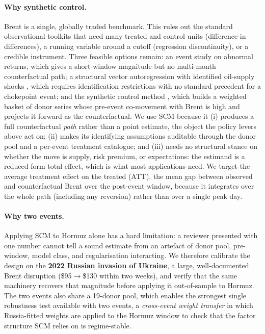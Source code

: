 \documentclass[11pt,a4paper]{article}
\begin{document}
\paragraph{Why synthetic control.} Brent is a single, globally traded benchmark.
This rules out the standard observational toolkits that need many treated and control
units (difference-in-differences), a running variable around a cutoff (regression
discontinuity), or a credible instrument. Three feasible options remain: an event
study on abnormal returns, which gives a short-window magnitude but no multi-month
counterfactual path; a structural vector autoregression with identified oil-supply
shocks \citep{kilian2009,baumeisterhamilton2019}, which requires identification
restrictions with no standard precedent for a chokepoint event; and the synthetic
control method \citep{abadie2010,abadie2021}, which builds a weighted basket of donor
series whose pre-event co-movement with Brent is high and projects it forward as the
counterfactual. We use SCM because it (i) produces a full counterfactual \emph{path}
rather than a point estimate, the object the policy levers above act on; (ii) makes
its identifying assumptions auditable through the donor pool and a per-event treatment
catalogue; and (iii) needs no structural stance on whether the move is supply, risk
premium, or expectations: the estimand is a reduced-form total effect, which is what
most applications need. We target the average treatment effect on the treated (ATT),
the mean gap between observed and counterfactual Brent over the post-event window,
because it integrates over the whole path (including any reversion) rather than over a
single peak day.

\paragraph{Why two events.} Applying SCM to Hormuz alone has a hard limitation: a
reviewer presented with one number cannot tell a sound estimate from an artefact of
donor pool, pre-window, model class, and regularisation interacting. We therefore
calibrate the design on the \textbf{2022 Russian invasion of Ukraine}, a large,
well-documented Brent disruption (\$95$\to$\$130 within two weeks), and verify that
the same machinery recovers that magnitude before applying it out-of-sample to
Hormuz. The two events also share a 19-donor pool, which enables the strongest single
robustness test available with two events, a \emph{cross-event weight transfer} in
which Russia-fitted weights are applied to the Hormuz window to check that the factor
structure SCM relies on is regime-stable.
\end{document}
